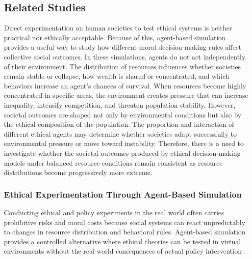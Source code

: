 \documentclass{icsthesis}
\begin{document}
\begin{mainmatter}
\subsection{Related Studies}
Direct experimentation on human societies to test ethical systems is neither practical nor ethically acceptable. Because of this, agent-based simulation provides a useful way to study how different moral decision-making rules affect collective social outcomes. In these simulations, agents do not act independently of their environment. The distribution of resources influences whether societies remain stable or collapse, how wealth is shared or concentrated, and which behaviors increase an agent's chances of survival. When resources become highly concentrated in specific areas, the environment creates pressure that can increase inequality, intensify competition, and threaten population stability. However, societal outcomes are shaped not only by environmental conditions but also by the ethical composition of the population. The proportion and interaction of different ethical agents may determine whether societies adapt successfully to environmental pressure or move toward instability. Therefore, there is a need to investigate whether the societal outcomes produced by ethical decision-making models under balanced resource conditions remain consistent as resource distributions become progressively more extreme.

\subsubsection{Ethical Experimentation Through Agent-Based Simulation}
Conducting ethical and policy experiments in the real world often carries prohibitive risks and moral costs because social systems can react unpredictably to changes in resource distribution and behavioral rules. Agent-based simulation provides a controlled alternative where ethical theories can be tested in virtual environments without the real-world consequences of actual policy intervention \citep{Tolk2022}.


\end{mainmatter}
\end{document}
